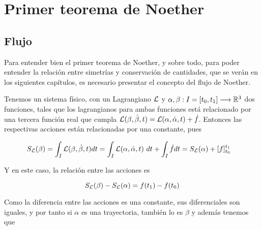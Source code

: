 \chapter{Primer teorema de Noether}

\section{Flujo}

Para entender bien el primer teorema de Noether, y sobre todo, para poder entender la relación entre simetrías y conservación de cantidades, que se verán en los siguientes capítulos, es necesario presentar el concepto del flujo de Noether.

Tenemos un sistema físico, con un Lagrangiano $\mathcal{L}$ y $\alpha,\beta:I=[t_0, t_1]\longrightarrow \mathbb{R}^3$ dos funciones, tales que los lagrangianos para ambas funciones está relacionado por una tercera función real que cumpla $\mathcal{L}(\beta, \dot{\beta}, t) = \mathcal{L}(\alpha, \dot{\alpha}, t)+\dot{f}$.
Entonces las respectivas acciones están relacionadas por una constante, pues

\begin{equation}
	\label{eq:variacion-accion}
	\begin{split}
		S_\lagrangiano(\beta) & = \int_I \lagrangiano(\beta, \dot{\beta}, t) dt = \int_I \lagrangiano(\alpha, \dot{\alpha}, t)\ dt+\int_I \dot{f}dt=S_\lagrangiano(\alpha) +[f]_{t_0}^{t_1}
	\end{split}
\end{equation}

Y en este caso, la relación entre las acciones es

\begin{equation}
	\label{eq:variacion-accion-relacion}
	S_{\mathcal{L}}(\beta) - S_{\mathcal{L}}(\alpha) = f(t_1) - f(t_0)
\end{equation}

Como la diferencia entre las acciones es una constante, sus diferenciales son iguales, y por tanto si $\alpha$ es una trayectoria, también lo es $\beta$ y además tenemos que

